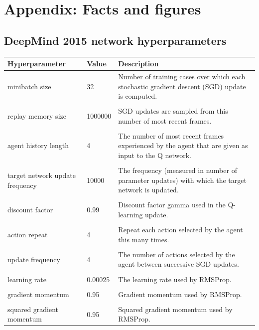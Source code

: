 \documentclass[10pt]{article}
\begin{document}
\section{Appendix: Facts and figures}
		
	\subsection{DeepMind 2015 network hyperparameters \cite{humanlevel}}
		\begin{table}[h]
\centering
\scriptsize
\begin{tabular}{p{3cm} l p{8cm}}
\textbf{Hyperparameter} & \textbf{Value} & \textbf{Description} \\ \hline
minibatch size & 32 & Number of  training cases over which each stochastic gradient descent (SGD) update is computed.\\
 & & \\
replay memory size & 1000000 & SGD updates are sampled from this number of most recent frames.\\
 & & \\
agent history length & 4 & The number of most recent frames experienced by the agent that are given as input to the Q network.\\
 & & \\
target network update frequency & 10000 & The frequency (measured in number of parameter updates) with which the target network is updated.\\
 & & \\
discount factor & 0.99 & Discount factor gamma used in the Q-learning update.\\
 & & \\
action repeat & 4 & Repeat each action selected by the agent this many times.\\
 & & \\
update frequency & 4 & The number of actions selected by the agent between successive SGD updates.\\
 & & \\
learning rate & 0.00025 & The learning rate used by RMSProp.\\
 & & \\
gradient momentum & 0.95 & Gradient momentum used by RMSProp.\\
 & & \\
squared gradient momentum & 0.95 & Squared gradient momentum used by RMSProp.\\

\end{tabular}
\end{table}
\end{document}
